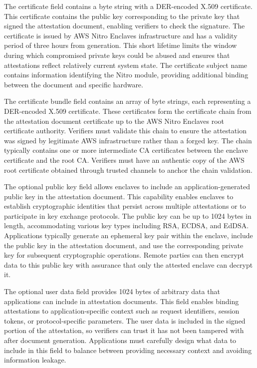 The certificate field contains a byte string with a DER-encoded X.509 certificate. This certificate contains the public key corresponding to the private key that signed the attestation document, enabling verifiers to check the signature. The certificate is issued by AWS Nitro Enclaves infrastructure and has a validity period of three hours from generation. This short lifetime limits the window during which compromised private keys could be abused and ensures that attestations reflect relatively current system state. The certificate subject name contains information identifying the Nitro module, providing additional binding between the document and specific hardware.

The certificate bundle field contains an array of byte strings, each representing a DER-encoded X.509 certificate. These certificates form the certificate chain from the attestation document certificate up to the AWS Nitro Enclaves root certificate authority. Verifiers must validate this chain to ensure the attestation was signed by legitimate AWS infrastructure rather than a forged key. The chain typically contains one or more intermediate CA certificates between the enclave certificate and the root CA. Verifiers must have an authentic copy of the AWS root certificate obtained through trusted channels to anchor the chain validation.

The optional public key field allows enclaves to include an application-generated public key in the attestation document. This capability enables enclaves to establish cryptographic identities that persist across multiple attestations or to participate in key exchange protocols. The public key can be up to 1024 bytes in length, accommodating various key types including RSA, ECDSA, and EdDSA. Applications typically generate an ephemeral key pair within the enclave, include the public key in the attestation document, and use the corresponding private key for subsequent cryptographic operations. Remote parties can then encrypt data to this public key with assurance that only the attested enclave can decrypt it.

The optional user data field provides 1024 bytes of arbitrary data that applications can include in attestation documents. This field enables binding attestations to application-specific context such as request identifiers, session tokens, or protocol-specific parameters. The user data is included in the signed portion of the attestation, so verifiers can trust it has not been tampered with after document generation. Applications must carefully design what data to include in this field to balance between providing necessary context and avoiding information leakage.

